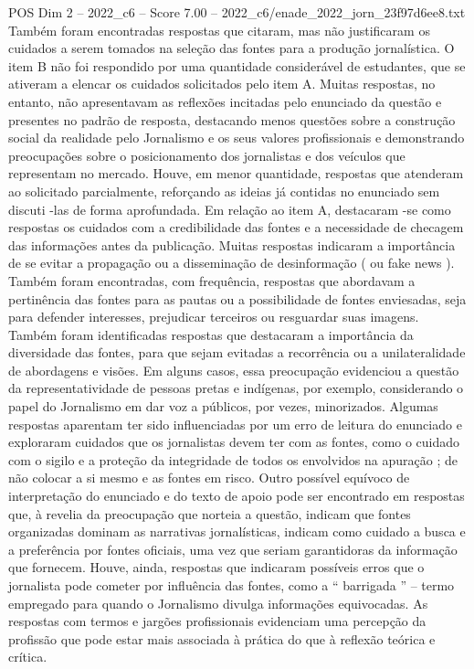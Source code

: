 \begin{textsample}{POS Dim 2 – 2022\_c6 – Score 7.00 – 2022\_c6/enade\_2022\_jorn\_23f97d6ee8.txt}
Também foram encontradas respostas que citaram, mas não justificaram os cuidados a serem tomados na seleção das fontes para a produção jornalística.
O item B não foi respondido por uma quantidade considerável de estudantes, que se ativeram a elencar os cuidados solicitados pelo item A.
Muitas respostas, no entanto, não apresentavam as reflexões incitadas pelo enunciado da questão e presentes no padrão de resposta, destacando menos questões sobre a construção social da realidade pelo Jornalismo e os seus valores profissionais e demonstrando preocupações sobre o posicionamento dos jornalistas e dos veículos que representam no mercado.
Houve, em menor quantidade, respostas que atenderam ao solicitado parcialmente, reforçando as ideias já contidas no enunciado sem discuti -las de forma aprofundada.
Em relação ao item A, destacaram -se como respostas os cuidados com a credibilidade das fontes e a necessidade de checagem das informações antes da publicação.
Muitas respostas indicaram a importância de se evitar a propagação ou a disseminação de desinformação ( ou fake news ).
Também foram encontradas, com frequência, respostas que abordavam a pertinência das fontes para as pautas ou a possibilidade de fontes enviesadas, seja para defender interesses, prejudicar terceiros ou resguardar suas imagens.
Também foram identificadas respostas que destacaram a importância da diversidade das fontes, para que sejam evitadas a recorrência ou a unilateralidade de abordagens e visões.
Em alguns casos, essa preocupação evidenciou a questão da representatividade de pessoas pretas e indígenas, por exemplo, considerando o papel do Jornalismo em dar voz a públicos, por vezes, minorizados.
Algumas respostas aparentam ter sido influenciadas por um erro de leitura do enunciado e exploraram cuidados que os jornalistas devem ter com as fontes, como o cuidado com o sigilo e a proteção da integridade de todos os envolvidos na apuração ; de não colocar a si mesmo e as fontes em risco.
Outro possível equívoco de interpretação do enunciado e do texto de apoio pode ser encontrado em respostas que, à revelia da preocupação que norteia a questão, indicam que fontes organizadas dominam as narrativas jornalísticas, indicam como cuidado a busca e a preferência por fontes oficiais, uma vez que seriam garantidoras da informação que fornecem.
Houve, ainda, respostas que indicaram possíveis erros que o jornalista pode cometer por influência das fontes, como a “ barrigada ” – termo empregado para quando o Jornalismo divulga informações equivocadas.
As respostas com termos e jargões profissionais evidenciam uma percepção da profissão que pode estar mais associada à prática do que à reflexão teórica e crítica.

\end{textsample}
